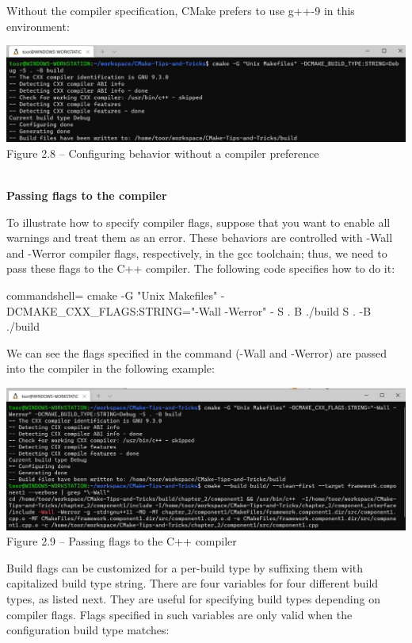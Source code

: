 Without the compiler specification, CMake prefers to use g++-9 in this environment:

\begin{center}
\includegraphics[width=1.\textwidth]{content/1/chapter2/images/8.jpg}\\
Figure 2.8 – Configuring behavior without a compiler preference
\end{center}

\hspace*{\fill} \\ %
\noindent
\textbf{Passing flags to the compiler}

To illustrate how to specify compiler flags, suppose that you want to enable all warnings and treat them as an error. These behaviors are controlled with -Wall and -Werror compiler flags, respectively, in the gcc toolchain; thus, we need to pass these flags to the C++ compiler. The following code specifies how to do it:

\begin{tcblisting}{commandshell={}}
cmake -G "Unix Makefiles" -DCMAKE_CXX_FLAGS:STRING="-Wall
  -Werror" - S . B ./build S . -B ./build
\end{tcblisting}

We can see the flags specified in the command (-Wall and -Werror) are passed into the compiler in the following example:

\begin{center}
\includegraphics[width=1.\textwidth]{content/1/chapter2/images/9.jpg}\\
Figure 2.9 – Passing flags to the C++ compiler
\end{center}

Build flags can be customized for a per-build type by suffixing them with capitalized build type string. There are four variables for four  different build types, as listed next. They are useful for specifying build types depending on compiler flags. Flags specified in such variables are only valid when the configuration build type matches:

